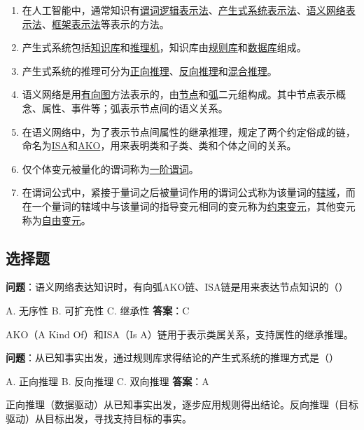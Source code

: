 \begin{enumerate}[leftmargin=2em,itemsep=2pt]
    \item 在人工智能中，通常知识有\underline{谓词逻辑表示法}、\underline{产生式系统表示法}、\underline{语义网络表示法}、\underline{框架表示法}等表示的方法。
    \item 产生式系统包括\underline{知识库}和\underline{推理机}，知识库由\underline{规则库}和\underline{数据库}组成。
    \item 产生式系统的推理可分为\underline{正向推理}、\underline{反向推理}和\underline{混合推理}。
    \item 语义网络是用\underline{有向图}方法表示的，由\underline{节点}和\underline{弧}二元组构成。其中节点表示概念、属性、事件等；弧表示节点间的语义关系。
    \item 在语义网络中，为了表示节点间属性的继承推理，规定了两个约定俗成的链，命名为\underline{ISA}和\underline{AKO}，用来表明类和子类、类和个体之间的关系。
    \item 仅个体变元被量化的谓词称为\underline{一阶谓词}。
    \item 在谓词公式中，紧接于量词之后被量词作用的谓词公式称为该量词的\underline{辖域}，而在一个量词的辖域中与该量词的指导变元相同的变元称为\underline{约束变元}，其他变元称为\underline{自由变元}。
\end{enumerate}

\subsection{选择题}

\begin{examplebox}[选择题2.1]
\textbf{问题}：语义网络表达知识时，有向弧AKO链、ISA链是用来表达节点知识的（\quad）

A. 无序性 \quad B. 可扩充性 \quad C. 继承性
\tcblower
\textbf{答案}：C

AKO（A Kind Of）和ISA（Is A）链用于表示类属关系，支持属性的继承推理。
\end{examplebox}

\begin{examplebox}[选择题2.2]
\textbf{问题}：从已知事实出发，通过规则库求得结论的产生式系统的推理方式是（\quad）

A. 正向推理 \quad B. 反向推理 \quad C. 双向推理
\tcblower
\textbf{答案}：A

正向推理（数据驱动）从已知事实出发，逐步应用规则得出结论。反向推理（目标驱动）从目标出发，寻找支持目标的事实。
\end{examplebox}

